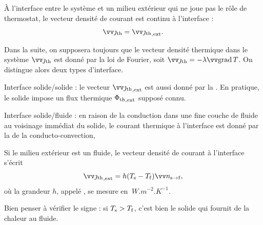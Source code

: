 \documentclass[12pt,fancy]{cours}
\begin{document}
\begin{prop}\label{prop:}
À l'interface entre le système et un milieu extérieur qui ne joue pas le rôle de thermostat, le vecteur densité de courant est continu à l'interface :
\begin{equation*}
\Vec{\jth}=\Vec{\jth}_{\rm, ext}.
\end{equation*}
\end{prop}
Dans la suite, on supposera toujours que le vecteur densité thermique dans le système $\Vec{\jth}$ est donné par la loi de Fourier, soit $\Vec{\jth} = - \lambda \grad T$. On distingue alors deux types d'interface.
\begin{liste}
\item Interface solide/solide : le vecteur  $\Vec{\jth}_{\rm, ext}$ est aussi donné par la . En pratique, le solide impose un flux thermique ${\Phi_{\rm th}}_{\rm, ext}$ supposé connu.


\item Interface solide/fluide : en raison de la conduction dans une fine couche de fluide au voisinage immédiat du solide, le courant thermique à l’interface est donné par la  de la conducto-convection,
\begin{theorem}
  Si le milieu extérieur est un fluide, le vecteur densité de courant à l'interface s'écrit
\begin{equation*}
\Vec{\jth}_{\rm, ext}=h(T_{\rm{s}}-T_{\rm{f}})\Vec{n}_{{\rm{s}\rightarrow \rm{f}}},
\end{equation*}
où la grandeur $h$, appelé , se mesure en $\SI{}{W.m^{-2}.K^{-1}}$.
\end{theorem}

Bien penser à vérifier le signe : si $T_{\rm{s}}>T_{\rm{f}}$, c'est bien le solide qui fournit de la chaleur au fluide.

\end{liste}
\end{document}
